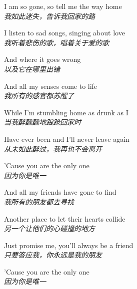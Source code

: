 \begin{spacing}{1.5}
\begin{flushleft}
I am so gone, so tell me the way home\\
\textit{我如此迷失，告诉我回家的路}\lyricspace

I listen to sad songs, singing about love\\
\textit{我听着悲伤的歌，唱着关于爱的歌}\lyricspace

And where it goes wrong\\
\textit{以及它在哪里出错}\lyricspace

And all my senses come to life\\
\textit{我所有的感官都苏醒了}\lyricspace

While I'm stumbling home as drunk as I\\
\textit{当我醉醺醺地踉跄回家时}\lyricspace

Have ever been and I'll never leave again\\
\textit{从未如此醉过，我再也不会离开}\lyricspace

'Cause you are the only one\\
\textit{因为你是唯一}\lyricspace

And all my friends have gone to find\\
\textit{我所有的朋友都去寻找}\lyricspace

Another place to let their hearts collide\\
\textit{另一个让他们的心碰撞的地方}\lyricspace

Just promise me, you'll always be a friend\\
\textit{只要答应我，你永远是我的朋友}\lyricspace

'Cause you are the only one\\
\textit{因为你是唯一}\lyricspace
\end{flushleft}
\end{spacing} 
